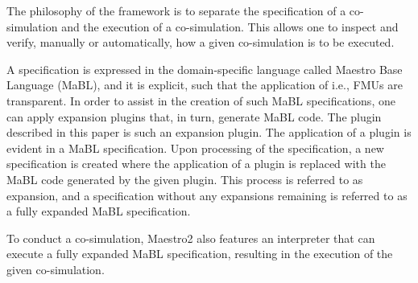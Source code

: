 The philosophy of the framework is to separate the specification of a co-simulation and the execution of a co-simulation. This allows one to inspect and verify, manually or automatically, how a given co-simulation is to be executed. 

A specification is expressed in the domain-specific language called Maestro Base Language (MaBL), and it is explicit, such that the application of i.e., FMUs are transparent. In order to assist in the creation of such MaBL specifications, one can apply expansion plugins that, in turn, generate MaBL code. The plugin described in this paper is such an expansion plugin. The application of a plugin is evident in a MaBL specification. Upon processing of the specification, a new specification is created where the application of a plugin is replaced with the MaBL code generated by the given plugin. This process is referred to as expansion, and a specification without any expansions remaining is referred to as a fully expanded MaBL specification. 

To conduct a co-simulation, Maestro2 also features an interpreter that can execute a fully expanded MaBL specification, resulting in the execution of the given co-simulation.